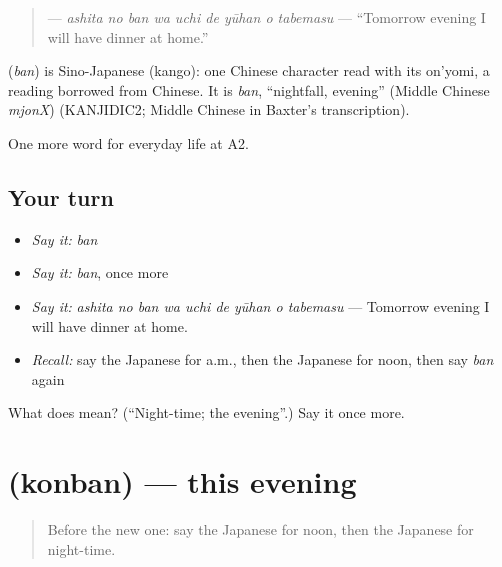 \begin{quote}
\textbf{    } — \emph{ashita no ban wa uchi de yūhan o tabemasu} — \textquotedblleft{}Tomorrow evening I will have dinner at home.\textquotedblright{}
\end{quote}

\begin{cousinweb}
\textbf{} (\emph{ban}) is Sino-Japanese (kango): one Chinese character read with its on'yomi, a reading borrowed from Chinese. It is \emph{ban}, \textquotedblleft{}nightfall, evening\textquotedblright{} (Middle Chinese \emph{mjonX}) (KANJIDIC2; Middle Chinese in Baxter's transcription).
\end{cousinweb}

\begin{grammarlens}[title={What you've built}]
One more word for everyday life at A2.
\end{grammarlens}

\subsection*{Your turn}
\begin{itemize}
\raggedright
  \item \emph{Say it:} \emph{ban}
  \item \emph{Say it:} \emph{ban}, once more
  \item \emph{Say it:} \emph{ashita no ban wa uchi de yūhan o tabemasu} — Tomorrow evening I will have dinner at home.
  \item \emph{Recall:} say the Japanese for a.m., then the Japanese for noon, then say \emph{ban} again
\end{itemize}

\begin{tcolorbox}[breakable,colback=teal!4,colframe=teal!35!black,title={Before you move on}]
What does  mean? (\textquotedblleft{}Night-time; the evening\textquotedblright{}.) Say it once more.
\end{tcolorbox}
\section[\texorpdfstring{\ja{こんばん} (konban)}{こんばん (konban)}]{ (konban) — this evening}

\label{lesson:JA-C166-konban}



\begin{quote}
Before the new one: say the Japanese for noon, then the Japanese for night-time.
\end{quote}

